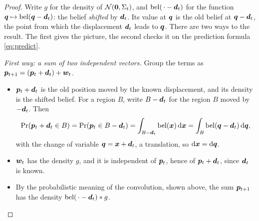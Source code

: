 \begin{proof}
Write $g$ for the density of $\mathcal{N}(\bm{0},\Sigma_t)$, and
$\operatorname{bel}(\,\cdot-\bm{d}_t)$ for the function
$\bm{q}\mapsto\operatorname{bel}(\bm{q}-\bm{d}_t)$: the belief \emph{shifted} by
$\bm{d}_t$. Its value at $\bm{q}$ is the old belief at
$\bm{q}-\bm{d}_t$, the point from which the displacement $\bm{d}_t$
leads to $\bm{q}$. There are two ways to the result. The first gives the
picture, the second checks it on the prediction formula
\eqref{eq:predict}.

\emph{First way: a sum of two independent vectors.} Group the terms as
$\bm{p}_{t+1}=(\bm{p}_t+\bm{d}_t)+\bm{w}_t$.
\begin{itemize}[nosep]
  \item $\bm{p}_t+\bm{d}_t$ is the old position moved by the known
        displacement, and its density is the shifted belief. For a region
        $B$, write $B-\bm{d}_t$ for the region $B$ moved by
        $-\bm{d}_t$. Then
        \[
          \Pr(\bm{p}_t+\bm{d}_t\in B)=\Pr(\bm{p}_t\in B-\bm{d}_t)
          =\int_{B-\bm{d}_t}\operatorname{bel}(\bm{x})\,\mathrm d\bm{x}
          =\int_B\operatorname{bel}(\bm{q}-\bm{d}_t)\,\mathrm d\bm{q} ,
        \]
        with the change of variable $\bm{q}=\bm{x}+\bm{d}_t$, a
        translation, so $\mathrm d\bm{x}=\mathrm d\bm{q}$.
  \item $\bm{w}_t$ has the density $g$, and it is independent of $\bm{p}_t$,
        hence of $\bm{p}_t+\bm{d}_t$, since $\bm{d}_t$ is known.
  \item By the probabilistic meaning of the convolution, shown above,
        the sum $\bm{p}_{t+1}$ has the density
        $\operatorname{bel}(\,\cdot-\bm{d}_t)\ast g$.
\end{itemize}


\end{proof}
